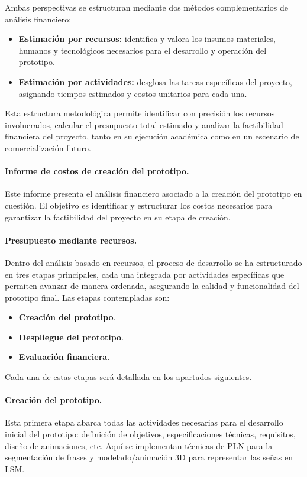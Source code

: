 Ambas perspectivas se estructuran mediante dos métodos complementarios de análisis financiero:

\begin{itemize}
	\item \textbf{Estimación por recursos:} identifica y valora los insumos materiales, humanos y tecnológicos necesarios para el desarrollo y operación del prototipo.
	\item \textbf{Estimación por actividades:} desglosa las tareas específicas del proyecto, asignando tiempos estimados y costos unitarios para cada una.
\end{itemize}

Esta estructura metodológica permite identificar con precisión los recursos involucrados, calcular el presupuesto total estimado y analizar la factibilidad financiera del proyecto, tanto en su ejecución académica como en un escenario de comercialización futuro.

\paragraph{\textbf{Informe de costos de creación del prototipo.}} 
Este informe presenta el análisis financiero asociado a la creación del prototipo en cuestión. El objetivo es identificar y estructurar los costos necesarios para garantizar la factibilidad del proyecto en su etapa de creación.

\paragraph{\textbf{Presupuesto mediante recursos.}} 
Dentro del análisis basado en recursos, el proceso de desarrollo se ha estructurado en tres etapas principales, cada una integrada por actividades específicas que permiten avanzar de manera ordenada, asegurando la calidad y funcionalidad del prototipo final. Las etapas contempladas son:

\begin{itemize}
	\item \textbf{Creación del prototipo}. 
	\item \textbf{Despliegue del prototipo}.
	\item \textbf{Evaluación financiera}. 
\end{itemize}

Cada una de estas etapas será detallada en los apartados siguientes.

\paragraph{\textbf{Creación del prototipo.}} 
Esta primera etapa abarca todas las actividades necesarias para el desarrollo inicial del prototipo: definición de objetivos, especificaciones técnicas, requisitos, diseño de animaciones, etc. Aquí se implementan técnicas de PLN para la segmentación de frases y modelado/animación 3D para representar las señas en LSM.

